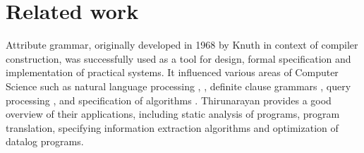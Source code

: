 \documentclass{article}
\begin{document}


\section{Related work} \label{relatedwork}


Attribute grammar, originally developed in 1968 by Knuth \cite{knuth1968semantics} in context of compiler
construction, was successfully used as a tool for design, formal specification
and implementation of practical systems. It influenced various areas of
Computer Science such as natural language processing \cite{hafiz2011modular}, \cite{starkie2002inferring}, 
definite clause grammars \cite{bratko2001prolog}, query processing \cite{koch2007attribute}, \cite{ramakrishnan1991top} and specification of algorithms \cite{bellanova1984examples}.
Thirunarayan \cite{thirunarayan2009attribute} provides a good overview of their
applications, including static analysis of programs, program translation, specifying information
extraction algorithms and optimization of datalog programs.
\end{document}
